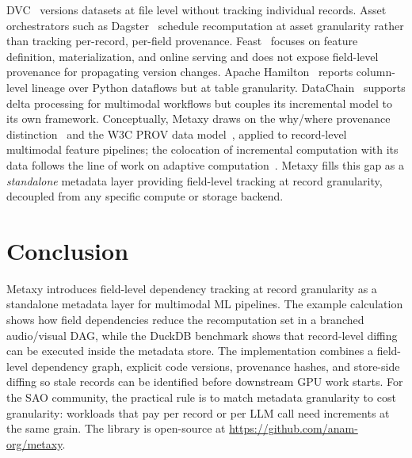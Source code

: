 \documentclass[sigconf]{acmart}
\begin{document}
DVC~\cite{dvc} versions datasets at file level without tracking individual records.
Asset orchestrators such as Dagster~\cite{dagster} schedule recomputation at asset granularity rather than tracking per-record, per-field provenance.
Feast~\cite{feast} focuses on feature definition, materialization, and online serving and does not expose field-level provenance for propagating version changes.
Apache Hamilton~\cite{hamilton} reports column-level lineage over Python dataflows but at table granularity.
DataChain~\cite{datachain} supports delta processing for multimodal workflows but couples its incremental model to its own framework.
Conceptually, Metaxy draws on the why/where provenance distinction~\cite{buneman2001why,cheney2009provenance} and the W3C PROV data model~\cite{moreau2013prov}, applied to record-level multimodal feature pipelines; the colocation of incremental computation with its data follows the line of work on adaptive computation~\cite{acar2006adaptive,cui2003lineage}.
Metaxy fills this gap as a \emph{standalone} metadata layer providing field-level tracking at record granularity, decoupled from any specific compute or storage backend.

\section{Conclusion}

Metaxy introduces field-level dependency tracking at record granularity as a standalone metadata layer for multimodal ML pipelines.
The example calculation shows how field dependencies reduce the recomputation set in a branched audio/visual DAG, while the DuckDB benchmark shows that record-level diffing can be executed inside the metadata store.
The implementation combines a field-level dependency graph, explicit code versions, provenance hashes, and store-side diffing so stale records can be identified before downstream GPU work starts.
For the SAO community, the practical rule is to match metadata granularity to cost granularity: workloads that pay per record or per LLM call need increments at the same grain.
The library is open-source at \url{https://github.com/anam-org/metaxy}.



\end{document}

